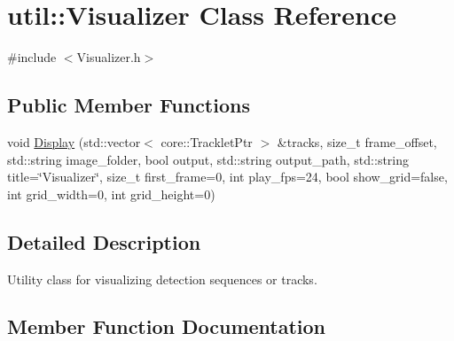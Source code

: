 \hypertarget{classutil_1_1Visualizer}{}\section{util\+:\+:Visualizer Class Reference}
\label{classutil_1_1Visualizer}


{\ttfamily \#include $<$Visualizer.\+h$>$}

\subsection*{Public Member Functions}
\begin{DoxyCompactItemize}
\item 
void \hyperlink{classutil_1_1Visualizer_a5168d3347dd28217a0e9bb6541fa38f3}{Display} (std\+::vector$<$ core\+::\+Tracklet\+Ptr $>$ \&tracks, size\+\_\+t frame\+\_\+offset, std\+::string image\+\_\+folder, bool output, std\+::string output\+\_\+path, std\+::string title=\char`\"{}Visualizer\char`\"{}, size\+\_\+t first\+\_\+frame=0, int play\+\_\+fps=24, bool show\+\_\+grid=false, int grid\+\_\+width=0, int grid\+\_\+height=0)
\end{DoxyCompactItemize}


\subsection{Detailed Description}
Utility class for visualizing detection sequences or tracks. 

\subsection{Member Function Documentation}
